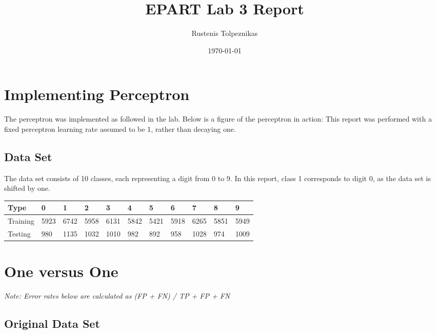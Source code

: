 \documentclass[
  a4paper,            %
  DIV=10,             %
  oneside,            %
  BCOR=5mm,           %
  parskip=half,       %
  numbers=noenddot,   %
  bibtotoc,           %
  listof=totoc,        %
  article
]{scrreprt}
\title{EPART Lab 3 Report}
\author{Rustenis Tolpeznikas}
\date{\today}
\begin{document}
\maketitle
\newpage

\section{Implementing Perceptron}
The perceptron was implemented as followed in the lab.
Below is a figure of the perceptron in action:
This report was performed with a fixed perceptron learning rate assumed to be 1, rather than decaying one.
\subsection{Data Set}
The data set consists of 10 classes, each representing a digit from 0 to 9.
In this report, class 1 corresponds to digit 0, as the data set is shifted by one.
\begin{center}
  \begin{tabular}{|p{2cm}|p{1cm}|p{1cm}|p{1cm}|p{1cm}|p{1cm}|p{1cm}|p{1cm}|p{1cm}|p{1cm}|p{1cm}|}
    \hline
    \textbf{Type} & \textbf{0} & \textbf{1} & \textbf{2} & \textbf{3} & \textbf{4} & \textbf{5} & \textbf{6} & \textbf{7} & \textbf{8} & \textbf{9} \\
    \hline
    Training & 5923 & 6742&5958&6131&5842&5421&5918&6265&5851&5949 \\
    \hline
    Testing &980&1135&1032&1010&982&892&958&1028&974&1009 \\
    \hline
  \end{tabular}
\end{center}

\section{One versus One}
\textit{Note: Error rates below are calculated as (FP + FN) / TP + FP + FN}
\subsection{Original Data Set}
\end{document}
